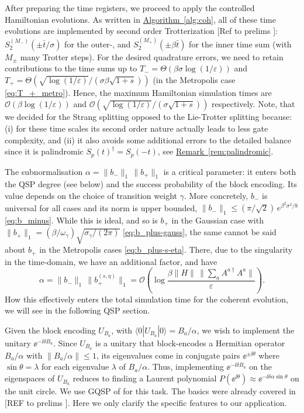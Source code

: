 After preparing the time registers, we proceed to apply the controlled Hamiltonian evolutions. As written in \hyperref[alg:coh]{Algorithm~\ref*{alg:coh}}, all of these time evolutions are implemented by second order Trotterization [Ref to prelims ]: $S_2^{(M_-)}(\pm \bar{t}/\sigma)$ for the outer-, and $S_2^{(M_+)}(\pm \beta\bar{t})$ for the inner time sum (with $M_\pm$ many Trotter steps). For the desired quadrature errors, we need to retain contributions to the time sums up to $T_- = \Theta(\beta\sigma\log(1/\varepsilon))$ and $T_+ = \Theta(\sqrt{\log(1/\varepsilon)}/(\sigma\beta\sqrt{1+s}))$ (in the Metropolis case \eqref{eq:T_+_metro}). Hence, the maximum Hamiltonian simulation times are $\mathcal{O}(\beta\log(1/\varepsilon))$ and $\mathcal{O}(\sqrt{\log(1/\varepsilon)}/(\sigma\sqrt{1+s}))$ respectively. Note, that we decided for the Strang splitting opposed to the Lie-Trotter splitting because: (i) for these time scales its second order nature actually leads to less gate complexity, and (ii) it also avoids some additional errors to the detailed balance since it is palindromic $S_p(t)^\dagger = S_p(-t)$, see \hyperref[rem:palindromic]{Remark~\ref*{rem:palindromic}}.

The subnormalisation $\alpha = \|b_-\|_1\,\|b_+\|_1$ is a critical parameter: it enters both the QSP degree (see below) and the success probability of the block encoding. Its value depends on the choice of transition weight $\gamma$. More concretely, $b_-$ is universal for all cases and its norm is upper bounded, $\|b_-\|_1 \leq (\pi/\sqrt{2})\,e^{\beta^2\sigma^2/8}$ \eqref{eq:b_minus}. While this is ideal, and so is $b_+$ in the Gaussian case with $\|b_+\|_1 = (\beta/\omega_\gamma)\sqrt{\sigma_\gamma/(2\pi)}$ \eqref{eq:b_plus-gauss}, the same cannot be said about $b_+$ in the Metropolis cases \eqref{eq:b_plus-s-eta}. There, due to the singularity in the time-domain, we have an additional factor, and have
$$
\alpha = \|b_-\|_1\,\|b_+^{(s,\eta)}\|_1 = \mathcal{O}\!\left(\log\frac{\beta\|H\|\,\|\textstyle\sum_a A^{a\dagger}A^a\|}{\varepsilon}\right).
$$
How this effectively enters the total simulation time for the coherent evolution, we will see in the following QSP section.

\medskip
Given the block encoding $U_{B_a}$, with $\langle 0|U_{B_a}|0\rangle = B_a/\alpha$, we wish to implement the unitary $\ee^{-\ii\delta B_a}$. Since $U_{B_a}$ is a unitary that block-encodes a Hermitian operator $B_a/\alpha$ with $\|B_a/\alpha\| \leq 1$, its eigenvalues come in conjugate pairs $\ee^{\pm \ii\theta}$ where $\sin\theta = \lambda$ for each eigenvalue $\lambda$ of $B_a/\alpha$.  Thus, implementing $\ee^{-\ii\delta B_a}$ on the eigenspaces of $U_{B_a}$ reduces to finding a Laurent polynomial $P(\ee^{\ii\theta}) \approx \ee^{-\ii\delta\alpha\sin\theta}$ on the unit circle. We use GQSP of \cite{motlagh2024generalized} for this task. The basics were already covered in [REF to prelims ]. Here we only clarify the specific features to our application.

